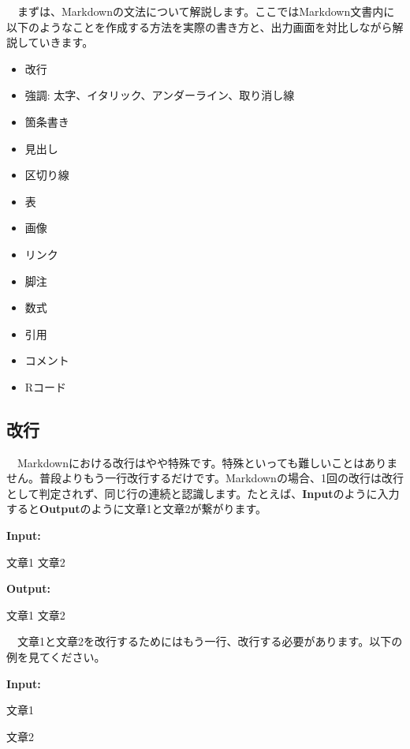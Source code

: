 \documentclass[
  a4paper,
  pandoc,
  ja=standard,
  jafont=haranoaji]{bxjsbook}
\newenvironment{Shaded}{\begin{snugshade}}{\end{snugshade}}
\newcommand{\NormalTok}[1]{\textcolor[rgb]{0.00,0.48,0.65}{#1}}
\providecommand{\tightlist}{%
  \setlength{\itemsep}{0pt}\setlength{\parskip}{0pt}}
\begin{document}
　まずは、Markdownの文法について解説します。ここではMarkdown文書内に以下のようなことを作成する方法を実際の書き方と、出力画面を対比しながら解説していきます。

\begin{itemize}
\tightlist
\item
  改行
\item
  強調: 太字、イタリック、アンダーライン、取り消し線
\item
  箇条書き
\item
  見出し
\item
  区切り線
\item
  表
\item
  画像
\item
  リンク
\item
  脚注
\item
  数式
\item
  引用
\item
  コメント
\item
  Rコード
\end{itemize}

\hypertarget{ux6539ux884c-1}{%
\subsection{改行}\label{ux6539ux884c-1}}

　Markdownにおける改行はやや特殊です。特殊といっても難しいことはありません。普段よりもう一行改行するだけです。Markdownの場合、1回の改行は改行として判定されず、同じ行の連続と認識します。たとえば、\textbf{Input}のように入力すると\textbf{Output}のように文章1と文章2が繋がります。

\textbf{Input:}

\begin{Shaded}
\begin{Highlighting}[]
\NormalTok{文章1}
\NormalTok{文章2}
\end{Highlighting}
\end{Shaded}

\textbf{Output:}

文章1 文章2

　文章1と文章2を改行するためにはもう一行、改行する必要があります。以下の例を見てください。

\textbf{Input:}

\begin{Shaded}
\begin{Highlighting}[]
\NormalTok{文章1}

\NormalTok{文章2}
\end{Highlighting}
\end{Shaded}
\end{document}
